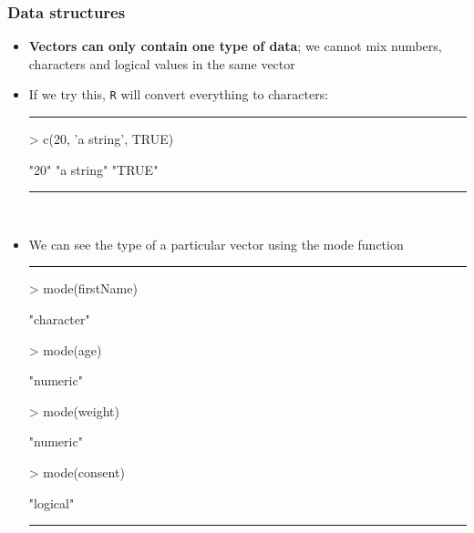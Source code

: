 \documentclass{beamer}
\begin{document}
\begin{frame}[fragile]
	\frametitle{Data structures}
	\begin{itemize}
		\small
		\item \textbf{Vectors can only contain one type of data}; we cannot mix numbers, characters and logical values in the same vector 
		\item If we try this, \texttt{R} will convert everything to characters:
\rule{\textwidth}{0.4pt}
\scriptsize
\begin{Schunk}
\begin{Sinput}
> c(20, 'a string', TRUE)
\end{Sinput}
\begin{Soutput}
[1] "20"       "a string" "TRUE"    
\end{Soutput}
\end{Schunk}
\rule{\textwidth}{0.4pt}\\
\small
\vspace{10pt}
		\item We can see the type of a particular vector using the mode function
\rule{\textwidth}{0.4pt}
\footnotesize
\setlength{\fancyvrbtopsep}{-1pt}
\setlength{\fancyvrbpartopsep}{-1pt}
\begin{Schunk}
\begin{Sinput}
> mode(firstName)
\end{Sinput}
\begin{Soutput}
[1] "character"
\end{Soutput}
\begin{Sinput}
> mode(age)
\end{Sinput}
\begin{Soutput}
[1] "numeric"
\end{Soutput}
\begin{Sinput}
> mode(weight)
\end{Sinput}
\begin{Soutput}
[1] "numeric"
\end{Soutput}
\begin{Sinput}
> mode(consent)
\end{Sinput}
\begin{Soutput}
[1] "logical"
\end{Soutput}
\end{Schunk}
\rule{\textwidth}{0.4pt}\\
		\small
\vspace{10pt}
	\end{itemize}
\end{frame}
\end{document}
